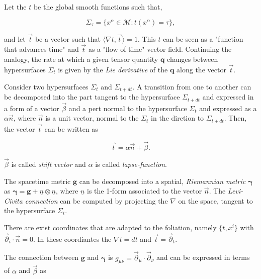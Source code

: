 {    
    Let the $t$ be the global smooth functions such that, 
    
    \begin{equation}
        \Sigma_{\tau} = \{x^{\alpha}\in\mathcal{M}: t(x^{\alpha})=\tau\},
    \end{equation}
    
    and let $\vec{t}$ be a vector such that $\langle\nabla t, \vec{t}\rangle = 1$. 
    This $t$ can be seen as a "function that advances time" and $\vec{t}$ as a "flow of time" vector field.
    Continuing the analogy, the rate at which a given tensor quantity $\boldsymbol{q}$ changes between hypersurfaces $\Sigma_t$ is given by the \textit{Lie derivative} of the $\boldsymbol{q}$ along the vector $\vec{t}$.
    
    Consider two hypersurfaces $\Sigma_t$ and $\Sigma_{t+dt}$. 
    A transition from one to another can be decomposed into the part tangent to the hypersurface $\Sigma_{t+dt}$ and expressed in a form of a vector $\vec{\beta}$ and a pert normal to the hypersurface $\Sigma_t$ and expressed as a $\alpha \vec{n}$, where $\vec{n}$ is a unit vector, normal to the $\Sigma_t$ in the diretion to $\Sigma_{t+dt}$. 
    Then, the vector $\vec{t}$ can be written as 
    
    \begin{equation}
        \vec{t} = \alpha\vec{n}+\vec{\beta}.
    \end{equation}
    
    $\vec{\beta}$ is called \textit{shift vector} and $\alpha$ is called \textit{lapse-function}. 
    
    The spacetime metric $\boldsymbol{g}$ can be decomposed into a spatial, \textit{Riemannian metric} $\boldsymbol{\gamma}$ as $\boldsymbol{\gamma} = \boldsymbol{g} + \underline{n} \otimes \underline{n}$, where $\underline{n}$ is the 1-form associated to the vector $\vec{n}$. 
    The \textit{Levi-Civita connection} can be computed by projecting the $\nabla$ on the space, tangent to the hypersurface $\Sigma_t$.
    
    There are exist coordinates that are adapted to the foliation, namely $\{t, x^i\}$ with $\vec{\partial}_i\cdot \vec{n} = 0$. 
    In these coordiantes the $\nabla t = dt$ and $\vec{t} = \vec{\partial}_t$. 
    
    The connection between $\boldsymbol{g}$ and $\boldsymbol{\gamma}$ is $g_{\mu\nu}=\vec{\partial}_{\mu}\cdot\vec{\partial}_{\nu} $ and can be expressed in terms of $\alpha$ and $\vec{\beta}$ as
    
}
